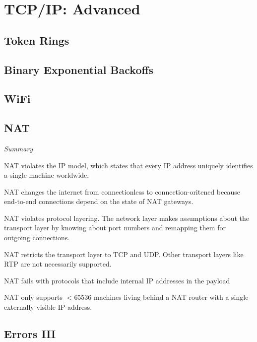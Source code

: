 \chapter{TCP/IP: Advanced}



\section{Token Rings}


\section{Binary Exponential Backoffs}


\section{WiFi}



\section{NAT}



\frmrule 

\textit{Summary}

NAT violates the IP model, which states that every IP address uniquely 
identifies a single machine worldwide. 

NAT changes the internet from connectionless to connection-oritened 
because end-to-end connections depend on the state of NAT gateways. 

NAT violates protocol layering. The network layer makes 
assumptions about the transport layer by knowing about port 
numbers and remapping them for outgoing connections. 

NAT retricts the transport layer to TCP and UDP. 
Other transport layers like RTP are not necessarily supported. 

NAT fails with protocols that include internal IP addresses in the payload

NAT only supports $< 65536$ machines living behind a NAT router with a 
single externally visible IP address. 



\section{Errors III }

